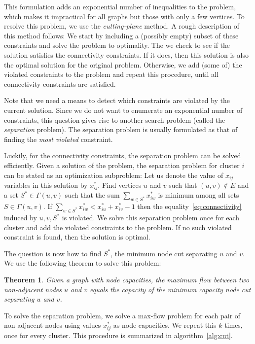 \documentclass[]{article}
\newtheorem{theorem}{Theorem}
\begin{document}
This formulation adds an exponential number of inequalities to the
problem, which makes it impractical for all graphs but those with only a
few vertices. To resolve this problem, we use the \emph{cutting-plane}
method. A rough description of this method follows: We start by
including a (possibly empty) subset of these constraints and solve the
problem to optimality. The we check to see if the solution satisfies the
connectivity constraints. If it does, then this solution is also the
optimal solution for the original problem. Otherwise, we add (some of)
the violated constraints to the problem and repeat this procedure, until
all connectivity constraints are satisfied.

Note that we need a means to detect which constraints are violated by
the current solution. Since we do not want to enumerate an exponential
number of constraints, this question gives rise to another search
problem (called the \emph{separation} problem). The separation problem
is usually formulated as that of finding the \emph{most violated}
constraint.

Luckily, for the connectivity constraints, the separation problem can be
solved efficiently. Given a solution of the problem, the
separation problem for cluster $i$ can be stated as an optimization subproblem: Let us denote the value of $x_{ij}$ variables in this solution by $x^*_{ij}$. Find vertices $u$ and $v$ such that $(u, v) \notin E$ and a set $S^* \in \Gamma(u, v)$ such that the sum $\sum_{w \in S^*} x_{iw}^*$ is
minimum among all sets $S \in \Gamma(u, v)$. If $\sum_{w \in S^*} x_{iw}^* < x^*_{iu} + x^*_{iv} - 1$ then the equality~\ref{eq:connectivity}
induced by $u, v, S^*$ is violated. We solve this separation problem
once for each cluster and add the violated constraints to the problem.
If no such violated constraint is found, then the solution is optimal.

The question is now how to find $S^*$, the minimum node cut separating
$u$ and $v$. We use the following theorem to solve this problem:

\begin{theorem}
Given a graph with node capacities, the maximum flow between
two non-adjacent nodes $u$ and $v$ equals the capacity of the minimum
capacity node cut separating $u$ and $v$.
\end{theorem}

To solve the separation problem, we solve a max-flow problem for each
pair of non-adjacent nodes using values $x^*_{ij}$ as node capacities. We repeat this $k$ times, once for every cluster. This procedure is summarized in algorithm~\ref{alg:cut}.
\end{document}
